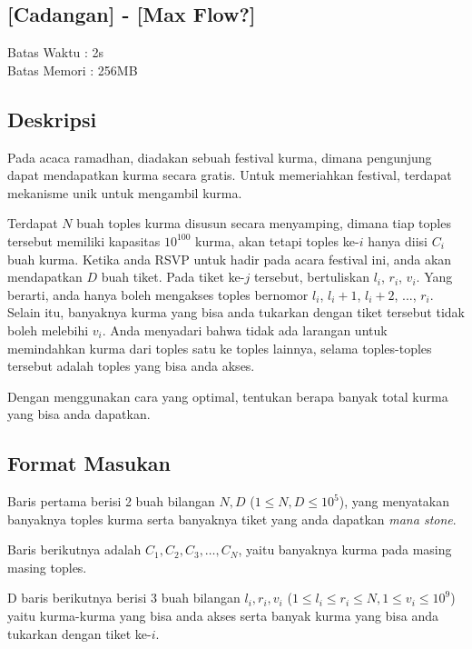 \documentclass{article}
\begin{document}
\begin{center}
    \section*{[Cadangan] - [Max Flow?]} %
    Batas Waktu : 2s \\  %
    Batas Memori :  256MB \\ %
\end{center}

\subsection*{Deskripsi}

Pada acaca ramadhan, diadakan sebuah festival kurma, dimana pengunjung dapat mendapatkan kurma secara gratis. Untuk memeriahkan festival, terdapat mekanisme unik untuk mengambil kurma.

Terdapat $N$ buah toples kurma disusun secara menyamping, dimana tiap toples tersebut memiliki kapasitas $10^{100}$ kurma, akan tetapi toples ke-$i$ hanya diisi $C_i$ buah kurma. Ketika anda RSVP untuk hadir pada acara festival ini, anda akan mendapatkan $D$ buah tiket. Pada tiket ke-$j$ tersebut, bertuliskan $l_i$, $r_i$, $v_i$. Yang berarti, anda hanya boleh mengakses toples bernomor $l_i$, $l_i+1$, $l_i+2$, ..., $r_i$. Selain itu, banyaknya kurma yang bisa anda tukarkan dengan tiket tersebut tidak boleh melebihi $v_i$. Anda menyadari bahwa tidak ada larangan untuk memindahkan kurma dari toples satu ke toples lainnya, selama toples-toples tersebut adalah toples yang bisa anda akses. 

Dengan menggunakan cara yang optimal, tentukan berapa banyak total kurma yang bisa anda dapatkan.
\subsection*{Format Masukan}

Baris pertama berisi 2 buah bilangan $N, D$ ($1 \leq N, D \leq 10^5$), yang menyatakan banyaknya toples kurma serta banyaknya tiket yang anda dapatkan \textit{mana stone}. 

Baris berikutnya adalah $C_1, C_2, C_3, \dots, C_N$, yaitu banyaknya kurma pada masing masing toples.

D baris berikutnya berisi 3 buah bilangan $l_i, r_i, v_i$ ($1 \leq l_i \leq r_i \leq N, 1 \leq v_i \leq 10^9$) yaitu kurma-kurma yang bisa anda akses serta banyak kurma yang bisa anda tukarkan dengan tiket ke-$i$.
\end{document}
